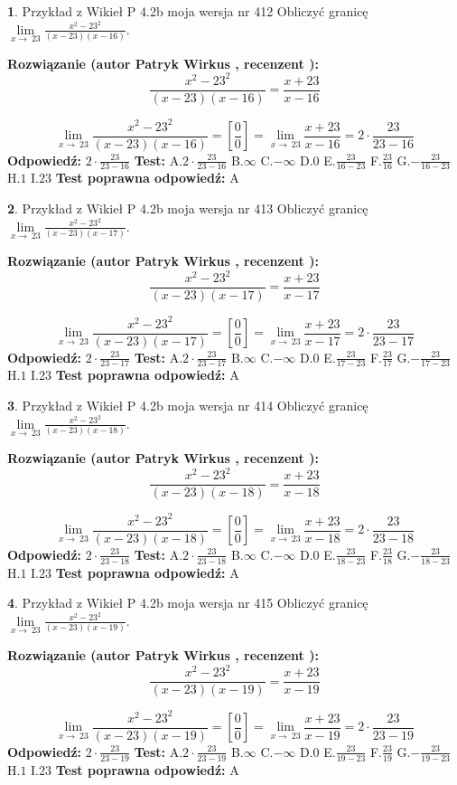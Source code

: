 \documentclass[12pt, a4paper]{article}
\theoremstyle{definition} %
\newtheorem{zad}{}
\newcommand{\zadStart}[1]{\begin{zad}#1\newline}
\newcommand{\zadStop}{\end{zad}}
\newcommand{\rozwStart}[2]{\noindent \textbf{Rozwiązanie (autor #1 , recenzent #2): }\newline}
\newcommand{\rozwStop}{\newline}
\newcommand{\odpStart}{\noindent \textbf{Odpowiedź:}\newline}
\newcommand{\odpStop}{\newline}
\newcommand{\testStart}{\noindent \textbf{Test:}\newline}
\newcommand{\testStop}{\newline}
\newcommand{\kluczStart}{\noindent \textbf{Test poprawna odpowiedź:}\newline}
\newcommand{\kluczStop}{\newline}
\begin{document}
\zadStart{Przykład z Wikieł P 4.2b moja wersja nr 412}
Obliczyć granicę $\lim\limits_{x\to\ 23}\frac{x^{2}-23^{2}}{(x-23)(x-16)}$.
\zadStop
\rozwStart{Patryk Wirkus}{}
$$\frac{x^{2}-23^{2}}{(x-23)(x-16)}=\frac{x+23}{x-16}$$

$$\lim\limits_{x\to\ 23}\frac{x^{2}-23^{2}}{(x-23)(x-16)}=[\frac{0}{0}]=\lim\limits_{x\to\ 23}\frac{x+23}{x-16}=2 \cdot \frac{23}{23-16}$$
\rozwStop
\odpStart
$2 \cdot \frac{23}{23-16}$
\odpStop
\testStart
A.$2 \cdot \frac{23}{23-16}$
B.$\infty$
C.$-\infty$
D.$0$
E.$\frac{23}{16-23}$
F.$\frac{23}{16}$
G.$-\frac{23}{16-23}$
H.$1$
I.$23$
\testStop
\kluczStart
A
\kluczStop



\zadStart{Przykład z Wikieł P 4.2b moja wersja nr 413}
Obliczyć granicę $\lim\limits_{x\to\ 23}\frac{x^{2}-23^{2}}{(x-23)(x-17)}$.
\zadStop
\rozwStart{Patryk Wirkus}{}
$$\frac{x^{2}-23^{2}}{(x-23)(x-17)}=\frac{x+23}{x-17}$$

$$\lim\limits_{x\to\ 23}\frac{x^{2}-23^{2}}{(x-23)(x-17)}=[\frac{0}{0}]=\lim\limits_{x\to\ 23}\frac{x+23}{x-17}=2 \cdot \frac{23}{23-17}$$
\rozwStop
\odpStart
$2 \cdot \frac{23}{23-17}$
\odpStop
\testStart
A.$2 \cdot \frac{23}{23-17}$
B.$\infty$
C.$-\infty$
D.$0$
E.$\frac{23}{17-23}$
F.$\frac{23}{17}$
G.$-\frac{23}{17-23}$
H.$1$
I.$23$
\testStop
\kluczStart
A
\kluczStop



\zadStart{Przykład z Wikieł P 4.2b moja wersja nr 414}
Obliczyć granicę $\lim\limits_{x\to\ 23}\frac{x^{2}-23^{2}}{(x-23)(x-18)}$.
\zadStop
\rozwStart{Patryk Wirkus}{}
$$\frac{x^{2}-23^{2}}{(x-23)(x-18)}=\frac{x+23}{x-18}$$

$$\lim\limits_{x\to\ 23}\frac{x^{2}-23^{2}}{(x-23)(x-18)}=[\frac{0}{0}]=\lim\limits_{x\to\ 23}\frac{x+23}{x-18}=2 \cdot \frac{23}{23-18}$$
\rozwStop
\odpStart
$2 \cdot \frac{23}{23-18}$
\odpStop
\testStart
A.$2 \cdot \frac{23}{23-18}$
B.$\infty$
C.$-\infty$
D.$0$
E.$\frac{23}{18-23}$
F.$\frac{23}{18}$
G.$-\frac{23}{18-23}$
H.$1$
I.$23$
\testStop
\kluczStart
A
\kluczStop



\zadStart{Przykład z Wikieł P 4.2b moja wersja nr 415}
Obliczyć granicę $\lim\limits_{x\to\ 23}\frac{x^{2}-23^{2}}{(x-23)(x-19)}$.
\zadStop
\rozwStart{Patryk Wirkus}{}
$$\frac{x^{2}-23^{2}}{(x-23)(x-19)}=\frac{x+23}{x-19}$$

$$\lim\limits_{x\to\ 23}\frac{x^{2}-23^{2}}{(x-23)(x-19)}=[\frac{0}{0}]=\lim\limits_{x\to\ 23}\frac{x+23}{x-19}=2 \cdot \frac{23}{23-19}$$
\rozwStop
\odpStart
$2 \cdot \frac{23}{23-19}$
\odpStop
\testStart
A.$2 \cdot \frac{23}{23-19}$
B.$\infty$
C.$-\infty$
D.$0$
E.$\frac{23}{19-23}$
F.$\frac{23}{19}$
G.$-\frac{23}{19-23}$
H.$1$
I.$23$
\testStop
\kluczStart
A
\kluczStop
\end{document}
